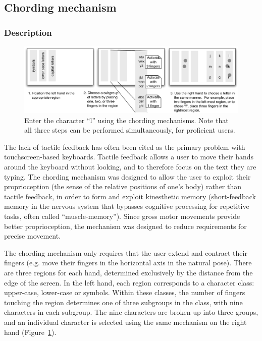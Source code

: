 \subsection{Chording mechanism}
\subsubsection{Description}

\begin{figure}
    \includegraphics[width=\textwidth]{Figures/chording_explaination.pdf} 
    \caption{Enter the character ``l'' using the chording mechanisms.
      Note that all three steps can be performed simultaneously, for
      proficient users.}
    \label{fig:chording_explanation}
\end{figure} 

The lack of tactile feedback has often been cited as the primary problem with touchscreen-based keyboards.  Tactile feedback allows a user to move their hands around the keyboard without looking, and to therefore focus on the text they are typing.  The chording mechanism was designed to allow the user to exploit their proprioception (the sense of the relative positions of one's body) rather than tactile feedback, in order to form and exploit kinesthetic memory (short-feedback memory in the nervous system that bypasses cognitive processing for repetitive tasks, often called ``muscle-memory''). Since gross motor movements provide better proprioception, the mechanism was designed to reduce requirements for precise movement.

The chording mechanism only requires that the user extend and contract their fingers (e.g. move their fingers in the horizontal axis in the natural pose).  There are three regions for each hand, determined exclusively by the distance from the edge of the screen.  In the left hand, each region corresponds to a character class: upper-case, lower-case or symbols.  Within these classes, the number of fingers touching the region determines one of three subgroups in the class, with nine characters in each subgroup.  The nine characters are broken up into three groups, and an individual character is selected using the same mechanism on the right hand
(Figure~\ref{fig:chording_explanation}).

